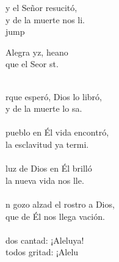 \begin{cancion}%
	y el Señor resucitó,\\
	y de la muerte nos li. \\jump\\
	\begin{chorus}%
	Alegra yz, heano\\
	que el Seor st.\\
	\end{chorus}%
	\jump\\
	rque esperó, Dios lo libró,\\
	y de la muerte lo sa.\\
	\jump\\
	 pueblo en Él vida encontró,\\
	la esclavitud ya termi.\\
	\jump\\
	 luz de Dios en Él brilló\\
	la nueva vida nos lle.\\
	\jump\\
	n gozo alzad el rostro a Dios,\\
	que de Él nos llega vación.\\
	\jump\\
	dos cantad: ¡Aleluya!\\
	todos gritad: ¡Alelu\\
\end{cancion}%
